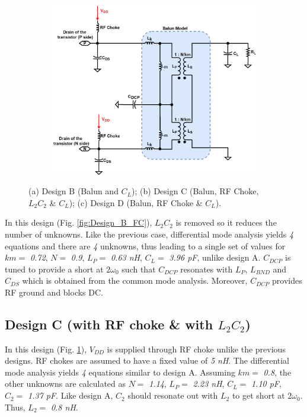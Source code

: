 \documentclass[conference]{IEEEtran}
\begin{document}
\begin{figure}[!t]
\begin{subfigure}{0.24\textwidth}
\caption{}
\label{fig:Design_C_FC}
\end{subfigure}
\begin{subfigure}{0.24\textwidth}
\includegraphics[width=1\textwidth]{Images/Design/Design_D_FC.png}
\caption{}
\label{fig:Design_D_FC}
\end{subfigure}
\caption{(a) Design B (Balun and $C_L$); (b) Design C (Balun, RF Choke, $L_2C_2$ \& $C_L$); (c) Design D (Balun, RF Choke \& $C_L$).}
\label{fig:Design_B_C_D}
\vspace{-0.25in}
\end{figure}

In this design (Fig. \ref{fig:Design_B_FC}), $L_2C_2$ is removed so it reduces the number of unknowns. Like the previous case, differential mode analysis yields \textit{4} equations and there are \textit{4} unknowns, thus leading to a single set of values for $km =$ \textit{0.72}, $N =$ \textit{0.9}, $L_P =$ \textit{0.63 nH}, $C_L =$ \textit{3.96 pF}, unlike design A. $C_{DCP}$ is tuned to provide a short at $2\omega_0$ such that $C_{DCP}$ resonates with $L_P$, $L_{BND}$ and $C_{DS}$ which is obtained from the common mode analysis. Moreover, $C_{DCP}$ provides RF ground and blocks DC.

\subsection{Design C (with RF choke \& with $L_2C_2$)}
In this design (Fig. \ref{fig:Design_C_FC}), $V_{DD}$ is supplied through RF choke unlike the previous designs. RF chokes are assumed to have a fixed value of \textit{5 nH}. The differential mode analysis yields \textit{4} equations similar to design A. Assuming $km =$ \textit{0.8}, the other unknowns are calculated as $N =$ \textit{1.14}, $L_P =$ \textit{2.23 nH}, $C_L =$ \textit{1.10 pF}, $C_2 =$ \textit{1.37 pF}.
Like design A, $C_2$ should resonate out with $L_2$ to get short at $2\omega_0$. Thus, $L_2 =$ \textit{0.8 nH}. 
\end{document}
